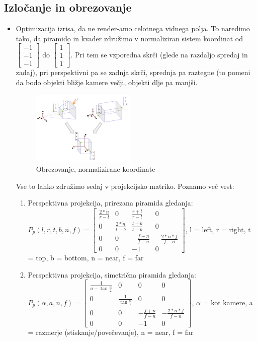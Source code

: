 \documentclass{article}
\begin{document}
\subsection{Izločanje in obrezovanje}
\begin{itemize}
    \item Optimizacija izrisa, da ne render-amo celotnega vidnega polja. To naredimo tako, da piramido in kvader združimo v normaliziran sistem koordinat od $\begin{bmatrix} -1 \\ -1 \\ -1 \end{bmatrix}$ do $\begin{bmatrix} 1 \\ 1 \\ 1 \end{bmatrix}$. Pri tem se vzporedna skrči (glede na razdaljo spredaj in zadaj), pri perspektivni pa se zadnja skrči, sprednja pa raztegne (to pomeni da bodo objekti bližje kamere večji, objekti dlje pa manjši. 
        \begin{figure}[H]
        \centering
        \includegraphics[width=50mm]{src/obrezovanje_normalizacija.png}
        \caption{Obrezovanje, normalizirane koordinate}
        \end{figure}     
    Vse to lahko združimo sedaj v projekcijsko matriko. Poznamo več vrst:
    \begin{enumerate}
        \item Perspektivna projekcija, prirezana piramida gledanja: $P_p(l,r,t,b,n,f) = \begin{bmatrix} \frac{2*n}{r-l} & 0 & \frac{r+l}{r-l} & 0 \\ 0 & \frac{2*n}{t-b} & \frac{t+b}{t-b} & 0 \\ 0 & 0 & -\frac{f+n}{f-n} & -\frac{2*n*f}{f-n} \\ 0 & 0 & -1 & 0 \end{bmatrix}$, l = left, r = right, t = top, b = bottom, n = near, f = far
        \item Perspektivna projekcija, simetrična piramida gledanja: $P_p(\alpha, a, n, f) = \begin{bmatrix} \frac{1}{a-\tan{\frac{\alpha}{2}}} & 0 & 0 & 0 \\ 0 & \frac{1}{\tan{\frac{\alpha}{2}}} & 0 & 0 \\ 0 & 0 & -\frac{f+n}{f-n} & -\frac{2*n*f}{f-n} \\ 0 & 0 & -1 & 0 \end{bmatrix}$, $\alpha$ = kot kamere, a = razmerje (stiskanje/povečevanje), n = near, f = far

\end{enumerate}
\end{itemize}
\end{document}
